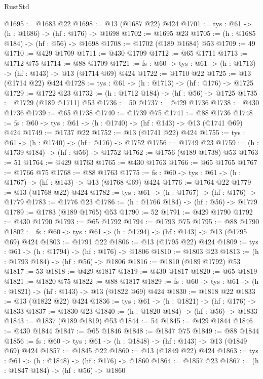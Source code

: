 \begin{lexlean}{RustStd}
\begin{coremodule}
@1695 := @1683 @22
@1698 := @13 (@1687 @22) @424
@1701 := {tys : @61} -> (h : @1686) -> (hf : @176) -> @1698
@1702 := @1695 @23
@1705 := (h : @1685 @184) -> (hf : @56) -> @1698
@1708 := @1702 (@189 @1684) @53
@1709 := 49
@1710 := @429 @1709
@1711 := @430 @1709
@1712 := @65 @1711
@1713 := @1712 @75
@1714 := @88 @1709
@1721 := {fs : @60} -> {tys : @61} -> (h : @1713) -> (hf : @143) -> @13 (@1714 @69) @424
@1722 := @1710 @22
@1725 := @13 (@1714 @22) @424
@1728 := {tys : @61} -> (h : @1713) -> (hf : @176) -> @1725
@1729 := @1722 @23
@1732 := (h : @1712 @184) -> (hf : @56) -> @1725
@1735 := @1729 (@189 @1711) @53
@1736 := 50
@1737 := @429 @1736
@1738 := @430 @1736
@1739 := @65 @1738
@1740 := @1739 @75
@1741 := @88 @1736
@1748 := {fs : @60} -> {tys : @61} -> (h : @1740) -> (hf : @143) -> @13 (@1741 @69) @424
@1749 := @1737 @22
@1752 := @13 (@1741 @22) @424
@1755 := {tys : @61} -> (h : @1740) -> (hf : @176) -> @1752
@1756 := @1749 @23
@1759 := (h : @1739 @184) -> (hf : @56) -> @1752
@1762 := @1756 (@189 @1738) @53
@1763 := 51
@1764 := @429 @1763
@1765 := @430 @1763
@1766 := @65 @1765
@1767 := @1766 @75
@1768 := @88 @1763
@1775 := {fs : @60} -> {tys : @61} -> (h : @1767) -> (hf : @143) -> @13 (@1768 @69) @424
@1776 := @1764 @22
@1779 := @13 (@1768 @22) @424
@1782 := {tys : @61} -> (h : @1767) -> (hf : @176) -> @1779
@1783 := @1776 @23
@1786 := (h : @1766 @184) -> (hf : @56) -> @1779
@1789 := @1783 (@189 @1765) @53
@1790 := 52
@1791 := @429 @1790
@1792 := @430 @1790
@1793 := @65 @1792
@1794 := @1793 @75
@1795 := @88 @1790
@1802 := {fs : @60} -> {tys : @61} -> (h : @1794) -> (hf : @143) -> @13 (@1795 @69) @424
@1803 := @1791 @22
@1806 := @13 (@1795 @22) @424
@1809 := {tys : @61} -> (h : @1794) -> (hf : @176) -> @1806
@1810 := @1803 @23
@1813 := (h : @1793 @184) -> (hf : @56) -> @1806
@1816 := @1810 (@189 @1792) @53
@1817 := 53
@1818 := @429 @1817
@1819 := @430 @1817
@1820 := @65 @1819
@1821 := @1820 @75
@1822 := @88 @1817
@1829 := {fs : @60} -> {tys : @61} -> (h : @1821) -> (hf : @143) -> @13 (@1822 @69) @424
@1830 := @1818 @22
@1833 := @13 (@1822 @22) @424
@1836 := {tys : @61} -> (h : @1821) -> (hf : @176) -> @1833
@1837 := @1830 @23
@1840 := (h : @1820 @184) -> (hf : @56) -> @1833
@1843 := @1837 (@189 @1819) @53
@1844 := 54
@1845 := @429 @1844
@1846 := @430 @1844
@1847 := @65 @1846
@1848 := @1847 @75
@1849 := @88 @1844
@1856 := {fs : @60} -> {tys : @61} -> (h : @1848) -> (hf : @143) -> @13 (@1849 @69) @424
@1857 := @1845 @22
@1860 := @13 (@1849 @22) @424
@1863 := {tys : @61} -> (h : @1848) -> (hf : @176) -> @1860
@1864 := @1857 @23
@1867 := (h : @1847 @184) -> (hf : @56) -> @1860

\end{coremodule}
\end{lexlean}
